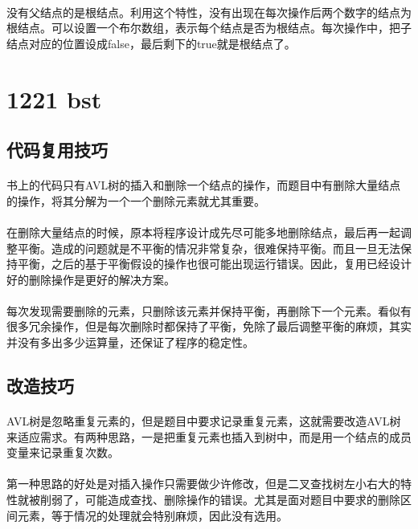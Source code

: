 \documentclass[UTF-8, 12pt]{ctexart}
\begin{document}
    \paragraph{}
	没有父结点的是根结点。利用这个特性，没有出现在每次操作后两个数字的结点为根结点。可以设置一个布尔数组，表示每个结点是否为根结点。每次操作中，把子结点对应的位置设成false，最后剩下的true就是根结点了。
    
\section{1221 bst}
    \subsection{代码复用技巧}
    \paragraph{}
    书上的代码只有AVL树的插入和删除一个结点的操作，而题目中有删除大量结点的操作，将其分解为一个一个删除元素就尤其重要。
    \paragraph{}
    在删除大量结点的时候，原本将程序设计成先尽可能多地删除结点，最后再一起调整平衡。造成的问题就是不平衡的情况非常复杂，很难保持平衡。而且一旦无法保持平衡，之后的基于平衡假设的操作也很可能出现运行错误。因此，复用已经设计好的删除操作是更好的解决方案。
    \paragraph{}
    每次发现需要删除的元素，只删除该元素并保持平衡，再删除下一个元素。看似有很多冗余操作，但是每次删除时都保持了平衡，免除了最后调整平衡的麻烦，其实并没有多出多少运算量，还保证了程序的稳定性。
    
    \subsection{改造技巧}
    \paragraph{}
    AVL树是忽略重复元素的，但是题目中要求记录重复元素，这就需要改造AVL树来适应需求。有两种思路，一是把重复元素也插入到树中，而是用一个结点的成员变量来记录重复次数。
    \paragraph{}
    第一种思路的好处是对插入操作只需要做少许修改，但是二叉查找树左小右大的特性就被削弱了，可能造成查找、删除操作的错误。尤其是面对题目中要求的删除区间元素，等于情况的处理就会特别麻烦，因此没有选用。
\end{document}
